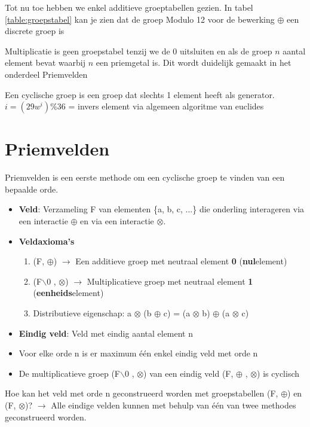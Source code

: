 \documentclass[12pt]{report}
\newcommand{\important}[1] {\textbf{\color{orange}#1}}
\begin{document}
Tot nu toe hebben we enkel additieve groeptabellen gezien. In tabel \ref{table:groepstabel} kan je zien dat de groep Modulo 12 
voor de bewerking $\oplus$ een discrete groep is

Multiplicatie is geen groepstabel tenzij we de 0 uitsluiten en als de groep $n$ aantal element bevat 
waarbij $n$ een priemgetal is. Dit wordt duidelijk gemaakt in het onderdeel Priemvelden

Een cyclische groep is een groep dat slechts 1 element heeft als generator. 
$i = (29w^i) \% 36$
 = invers element via algemeen algoritme van euclides

\section{Priemvelden}
Priemvelden is een eerste methode om een cyclische groep te vinden van een bepaalde orde.
\begin{itemize}
	\item \important{Veld}: Verzameling F van elementen \{a, b, c, ...\} die onderling interageren via een interactie $\oplus$ en via 
	      een interactie $\otimes$.
	      	      
	\item \important{Veldaxioma's}
	      \begin{enumerate}
	      	\item (F, $\oplus$) $\rightarrow$ Een additieve groep met neutraal element \important{0} (\important{nul}element)
	      	\item (F$\backslash$0 , $\otimes$) $\rightarrow$ Multiplicatieve groep met neutraal element \important{1} 
	      	      (\important{eenheids}element)
	      	\item Distributieve eigenschap: a $\otimes$ (b $\oplus$ c) = (a $\otimes$ b) $\oplus$ (a $\otimes$ c)
	      \end{enumerate}
	\item \important{Eindig veld}: Veld met eindig aantal element n
	\item Voor elke orde n is er maximum één enkel eindig veld met orde n
	\item De multiplicatieve groep (F$\backslash$0 , $\otimes$) van een eindig veld (F, $\oplus$ , $\otimes$) is cyclisch
\end{itemize}
Hoe kan het veld met orde n geconstrueerd worden met groepstabellen (F, $\oplus$) en (F, $\otimes$)? $\rightarrow$ Alle eindige velden
kunnen met behulp van één van twee methodes geconstrueerd worden.
\end{document}
